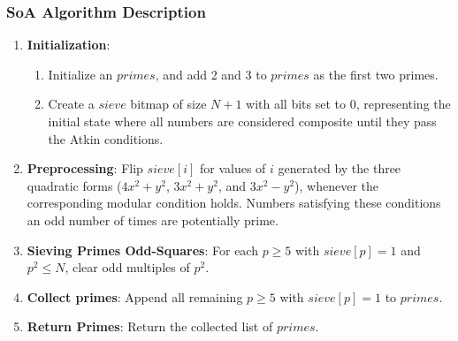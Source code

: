 \documentclass{article}
\begin{document}
\subsubsection*{SoA Algorithm Description}
\begin{enumerate}[noitemsep]
    \item \textbf{Initialization}: 
    \begin{enumerate}
        \item Initialize an  $primes$, and add 2 and 3 to $primes$ as the first two primes.
        \item Create a $sieve$ bitmap of size $N+1$ with all bits set to 0, representing the initial state where all numbers are considered composite until they pass the Atkin conditions.
    \end{enumerate}
    \item \textbf{Preprocessing}: Flip $sieve[i]$ for values of $i$ generated by the three quadratic forms ($4x^2 + y^2$, $3x^2 + y^2$, and $3x^2 - y^2$), whenever the corresponding modular condition holds. Numbers satisfying these conditions an odd number of times are potentially prime.
    \item \textbf{Sieving Primes Odd-Squares}: For each $p\ge 5$ with $sieve[p]=1$ and $p^2 \le N$, clear odd multiples of $p^2$.
    \item \textbf{Collect primes}: Append all remaining $p\ge 5$ with $sieve[p]=1$ to $primes$.
    \item \textbf{Return Primes}: Return the collected list of $primes$.
\end{enumerate}
\end{document}

